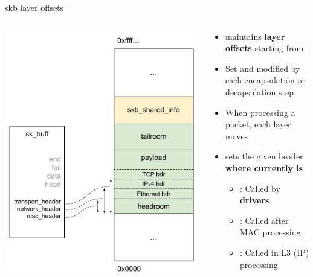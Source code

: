 \begin{frame}{skb layer offsets}
	\begin{columns}
		\begin{column}{0.3\textwidth}
			\includegraphics[width=\textwidth]{slides/networking-skb/skb_layers_offsets.pdf}
		\end{column}
		\begin{column}{0.7\textwidth}
			\begin{itemize}
				\item {} maintains \textbf{layer offsets} starting from 
				\item Set and modified by each encapsulation or decapsulation step
				\item When processing a packet, each layer moves 
				\item {} sets the given header \textbf{where  currently is}
					\begin{itemize}
						\item {} : Called by \textbf{drivers}
						\item {} : Called after MAC processing
						\item {} : Called in L3 (IP) processing
					\end{itemize}
			\end{itemize}
		\end{column}
	\end{columns}
\end{frame}

